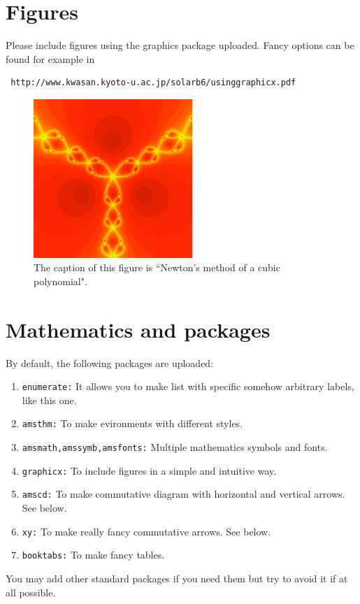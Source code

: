 \documentclass[12,twoside]{TFG-GM}
\theoremstyle{definition}
\theoremstyle{remark}
\begin{document}
\section{Figures}

Please include figures using the graphics package uploaded.  Fancy options can be found for example in  \begin{verbatim} http://www.kwasan.kyoto-u.ac.jp/solarb6/usinggraphicx.pdf \end{verbatim}

\begin{figure}[htb!]
\begin{center}
\includegraphics[width=6cm]{samplefigure.pdf}
\end{center}
\caption{\label{sample figure} \small The caption of this figure is ``Newton's method of a cubic polynomial".}
\end{figure}

\section{Mathematics and packages} \label{packages}

By default, the following packages are uploaded:
\begin{enumerate}[\bf (1)]
\item {\tt enumerate:} It allows you to make list with specific somehow arbitrary labels, like this one.
\item {\tt amsthm:} To make evironments with different styles.
\item {\tt amsmath,amssymb,amsfonts:} Multiple mathematics symbols and fonts.
\item {\tt graphicx:} To include figures in a simple and intuitive way.
\item {\tt amscd:} To make commutative diagram with horizontal and vertical arrows. See below.
\item {\tt xy:} To make really fancy commutative arrows. See below.
\item {\tt booktabs:} To make fancy tables.
\end{enumerate}
You may add other standard packages if you need them but try to avoid it if at all possible.
\end{document}

